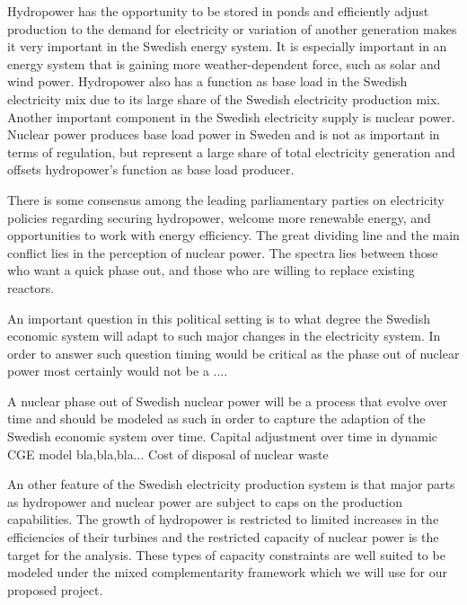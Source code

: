 \documentclass[10pt,a4paper]{article}
\begin{document}
Hydropower has the opportunity to be stored in ponds and efficiently adjust production to the demand for electricity or variation of another generation makes it very important in the Swedish energy system. It is especially important in an energy system that is gaining more weather-dependent force, such as solar and wind power. Hydropower also has a function as base load in the Swedish electricity mix due to its large share of the Swedish electricity production mix. Another important component in the Swedish electricity supply is nuclear power. Nuclear power produces base load power in Sweden and is not as important in terms of regulation, but represent a large share of total electricity generation and offsets hydropower's function as base load producer.

There is some consensus among the leading parliamentary parties on electricity policies regarding securing hydropower, welcome more renewable energy, and opportunities to work with energy efficiency. The great dividing line and the main conflict lies in the perception of nuclear power. The spectra lies between those who want a quick phase out, and those who are willing to replace existing reactors.

An important question in this political setting is to what degree the Swedish economic system will adapt to such major changes in the electricity system. In order to answer such question timing would be critical as the phase out of nuclear power most certainly would not be a ....

A nuclear phase out of Swedish nuclear power will be a process that evolve over time and should be modeled as such in order to capture the adaption of the Swedish economic system over time. Capital adjustment over time in dynamic CGE model bla,bla,bla...
Cost of disposal of nuclear waste

An other feature of the Swedish electricity production system is that major parts as hydropower and nuclear power are subject to caps on the production capabilities. The growth of hydropower is restricted to limited increases in the efficiencies of their turbines and the restricted capacity of nuclear power is the target for the analysis. These types of capacity constraints are well suited to be modeled under the mixed complementarity framework \citep{raey} which we will use for our proposed project.
\end{document}
